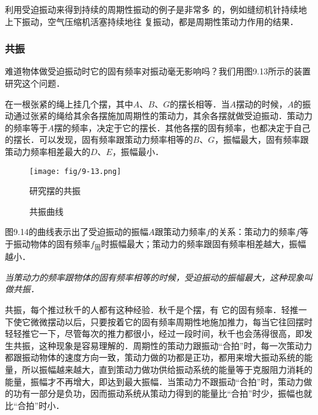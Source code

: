 利用受迫振动来得到持续的周期性振动的例子是非常多
的，例如缝纫机针持续地上下振动，空气压缩机活塞持续地往
复振动，都是周期性策动力作用的结果．

\subsubsection{共振}

难道物体做受迫振动时它的固有频率对振动毫无影响吗？我们用图9.13所示的装置研究这个问题．

在一根张紧的绳上挂几个摆，其中$A$、$B$、$G$的摆长相等．当$A$摆动的时候，$A$的振动通过张紧的绳给其余各摆施加周期性的策动力，其余各摆就做受迫振动．策动力的频率等于$A$摆的频率，决定于它的摆长．其他各摆的固有频率，也都决定于自己的摆长．可以发现，固有频率跟策动力频率相等的$B$、$G$，振幅最大，固有频率跟策动力频率相差最大的$D$、$E$，振幅最小．

\begin{figure}[htp]\centering
    \begin{minipage}[t]{0.48\textwidth}
    \centering
    \texttt{[image: fig/9-13.png]}
    \caption{研究摆的共振}
    \end{minipage}
    \begin{minipage}[t]{0.48\textwidth}
    \centering
{}
    \caption{共振曲线}
    \end{minipage}
    \end{figure}


图9.14的曲线表示出了受迫振动的振幅$A$跟策动力频率$f$的关系：策动力的频率$f$等于振动物体的固有频率$f_{\text{固}}$时振幅最大；策动力的频率跟固有频率相差越大，振幅越小．

\textit{当策动力的频率跟物体的固有频率相等的时候，受迫振动的振幅最大，这种现象叫做共振．}

共振，每个推过秋千的人都有这种经验．秋千是个摆，有
它的固有频率．轻推一下使它微微摆动以后，只要按着它的固有频率周期性地施加推力，每当它往回摆时轻轻推它一下，尽管每次的推力都很小，经过一段时间，秋千也会荡得很高，即发生共振，这种现象是容易理解的．周期性的策动力跟振动“合拍”时，每一次策动力都跟振动物体的速度方向一致，策动力做的功都是正功，都用来增大振动系统的能量，所以振幅越来越大，直到策动力做功供给振动系统的能量等于克服阻力消耗的能量，振幅才不再增大，即达到最大振幅．当策动力不跟振动“合拍”时，策动力做的功有一部分是负功，因而振动系统从策动力得到的能量比“合拍”时少，振幅也就比“合拍”时小．

